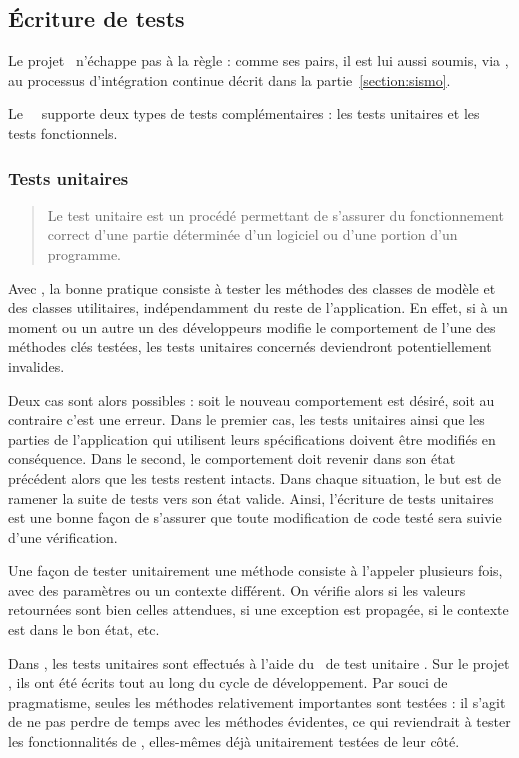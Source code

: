 \subsection{Écriture de tests}
\label{section:eyrolles_tests}

Le projet \aey\ n'échappe pas à la règle : comme ses pairs, il est lui aussi soumis, via \asismo, au processus d'intégration continue décrit dans la partie~\ref{section:sismo}.

Le \afm\ \asf\ supporte deux types de tests complémentaires : les tests unitaires et les tests fonctionnels.


\subsubsection{Tests unitaires}

\begin{quote}
Le test unitaire est un procédé permettant de s'assurer du fonctionnement correct d'une partie déterminée d'un logiciel ou d'une portion d'un programme.~\cite{unit}
\end{quote}

Avec \asf, la bonne pratique consiste à tester les méthodes des classes de modèle et des classes utilitaires, indépendamment du reste de l'application. En effet, si à un moment ou un autre un des développeurs modifie le comportement de l'une des méthodes clés testées, les tests unitaires concernés deviendront potentiellement invalides.

Deux cas sont alors possibles : soit le nouveau comportement est désiré, soit au contraire c'est une erreur. Dans le premier cas, les tests unitaires ainsi que les parties de l'application qui utilisent leurs spécifications doivent être modifiés en conséquence. Dans le second, le comportement doit revenir dans son état précédent alors que les tests restent intacts. Dans chaque situation, le but est de ramener la suite de tests vers son état valide. Ainsi, l'écriture de tests unitaires est une bonne façon de s'assurer que toute modification de code testé sera suivie d'une vérification.

Une façon de tester unitairement une méthode consiste à l'appeler plusieurs fois, avec des paramètres ou un contexte différent. On vérifie alors si les valeurs retournées sont bien celles attendues, si une exception est propagée, si le contexte est dans le bon état, etc.

Dans \asf, les tests unitaires sont effectués à l'aide du \afm\ de test unitaire \alime. Sur le projet \aey, ils ont été écrits tout au long du cycle de développement. Par souci de pragmatisme, seules les méthodes relativement importantes sont testées : il s'agit de ne pas perdre de temps avec les méthodes évidentes, ce qui reviendrait à tester les fonctionnalités de \asf, elles-mêmes déjà unitairement testées de leur côté.

